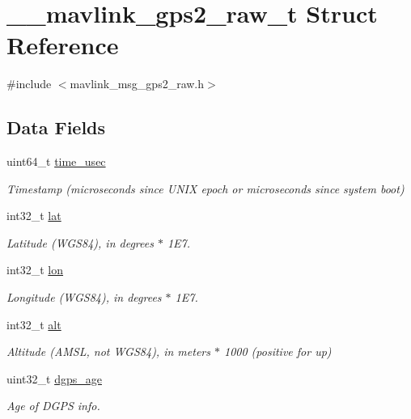 \hypertarget{struct____mavlink__gps2__raw__t}{\section{\+\_\+\+\_\+mavlink\+\_\+gps2\+\_\+raw\+\_\+t Struct Reference}
\label{struct____mavlink__gps2__raw__t}
}


{\ttfamily \#include $<$mavlink\+\_\+msg\+\_\+gps2\+\_\+raw.\+h$>$}

\subsection*{Data Fields}
\begin{DoxyCompactItemize}
\item 
uint64\+\_\+t \hyperlink{struct____mavlink__gps2__raw__t_a355d2b8ac770c7c8954f67f0890d4182}{time\+\_\+usec}
\begin{DoxyCompactList}\small\item\em Timestamp (microseconds since U\+N\+I\+X epoch or microseconds since system boot) \end{DoxyCompactList}\item 
int32\+\_\+t \hyperlink{struct____mavlink__gps2__raw__t_a8e41540c2162784e3e4956ba678413c0}{lat}
\begin{DoxyCompactList}\small\item\em Latitude (W\+G\+S84), in degrees $\ast$ 1\+E7. \end{DoxyCompactList}\item 
int32\+\_\+t \hyperlink{struct____mavlink__gps2__raw__t_a37b1686f9653b3c0eaa4880de4eb658b}{lon}
\begin{DoxyCompactList}\small\item\em Longitude (W\+G\+S84), in degrees $\ast$ 1\+E7. \end{DoxyCompactList}\item 
int32\+\_\+t \hyperlink{struct____mavlink__gps2__raw__t_a80e10f0957688a9b8038254555c06df6}{alt}
\begin{DoxyCompactList}\small\item\em Altitude (A\+M\+S\+L, not W\+G\+S84), in meters $\ast$ 1000 (positive for up) \end{DoxyCompactList}\item 
uint32\+\_\+t \hyperlink{struct____mavlink__gps2__raw__t_a91a398a7a4642951e1648e042c2e32cb}{dgps\+\_\+age}
\begin{DoxyCompactList}\small\item\em Age of D\+G\+P\+S info. \end{DoxyCompactList}\item 

\end{DoxyCompactItemize}
